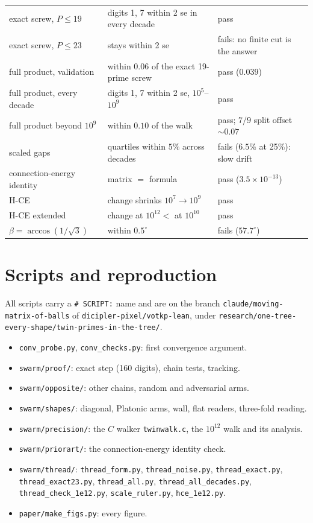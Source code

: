 \documentclass[11pt]{article}
\theoremstyle{definition}
\theoremstyle{remark}
\begin{document}
\begin{longtable}{p{4.2cm}p{6.2cm}p{4.3cm}}
exact screw, $P\le19$ & digits 1, 7 within 2 se in every decade & pass\\
exact screw, $P\le23$ & stays within 2 se & fails: no finite cut is the answer\\
full product, validation & within $0.06$ of the exact 19-prime screw & pass ($0.039$)\\
full product, every decade & digits 1, 7 within 2 se, $10^5$--$10^9$ & pass\\
full product beyond $10^9$ & within $0.10$ of the walk & pass; $7/9$ split offset $\sim0.07$\\
scaled gaps & quartiles within $5\%$ across decades & fails ($6.5\%$ at 25\%): slow drift\\
connection-energy identity & matrix $=$ formula & pass ($3.5\times10^{-13}$)\\
H-CE & change shrinks $10^7\to10^9$ & pass\\
H-CE extended & change at $10^{12}<$ at $10^{10}$ & pass\\
$\beta=\arccos(1/\sqrt3)$ & within $0.5^\circ$ & fails ($57.7^\circ$)\\
\bottomrule
\end{longtable}
\normalsize

\section{Scripts and reproduction}
\sloppy
All scripts carry a \texttt{\# SCRIPT:} name and are on the branch \texttt{claude/moving-matrix-of-balls} of \texttt{dicipler-pixel/votkp-lean}, under \texttt{research/one-tree-every-shape/twin-primes-in-the-tree/}.
\begin{itemize}
\item \texttt{conv\_probe.py}, \texttt{conv\_checks.py}: first convergence argument.
\item \texttt{swarm/proof/}: exact step (160 digits), chain tests, tracking.
\item \texttt{swarm/opposite/}: other chains, random and adversarial arms.
\item \texttt{swarm/shapes/}: diagonal, Platonic arms, wall, flat readers, three-fold reading.
\item \texttt{swarm/precision/}: the $C$ walker \texttt{twinwalk.c}, the $10^{12}$ walk and its analysis.
\item \texttt{swarm/priorart/}: the connection-energy identity check.
\item \texttt{swarm/thread/}: \texttt{thread\_form.py}, \texttt{thread\_noise.py}, \texttt{thread\_exact.py}, \texttt{thread\_exact23.py}, \texttt{thread\_all.py}, \texttt{thread\_all\_decades.py}, \texttt{thread\_check\_1e12.py}, \texttt{scale\_ruler.py}, \texttt{hce\_1e12.py}.
\item \texttt{paper/make\_figs.py}: every figure.
\end{itemize}
\end{document}
